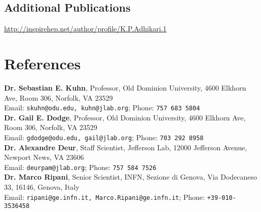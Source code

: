 \documentclass[10pt, letterpaper]{article}
\begin{document}
\subsection*{Additional Publications}
\noindent
 \url{http://inspirehep.net/author/profile/K.P.Adhikari.1}






\section*{References}
\textbf{Dr. Sebastian E. Kuhn}, Professor, Old Dominion University, 4600 Elkhorn Ave, Room 306, Norfolk, VA 23529 \\
Email: \texttt{skuhn@odu.edu, kuhn@jlab.org}; Phone: \texttt{757 683 5804} \\

\textbf{Dr. Gail E. Dodge}, Professor, Old Dominion University, 4600 Elkhorn Ave, Room 306, Norfolk, VA 23529 \\
Email: \texttt{gdodge@odu.edu, gail@jlab.org}; Phone: \texttt{703 292 8958}\\

\textbf{Dr. Alexandre Deur}, Staff Scientist, Jefferson Lab, 12000 Jefferson Avenue, Newport News, VA 23606 \\
Email: \texttt{deurpam@jlab.org}; Phone: \texttt{757 584 7526}\\ 

\textbf{Dr. Marco Ripani}, Senior Scientist, INFN, Sezione di Genova, Via Dodecaneso 33, 16146, Genova, Italy \\
Email: \texttt{ripani@ge.infn.it, Marco.Ripani@ge.infn.it}; Phone: \texttt{+39-010-3536458}\\ 
\end{document}
